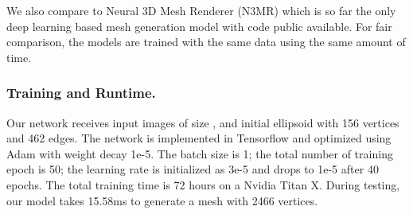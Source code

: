 \documentclass[runningheads]{llncs}
\begin{document}
We also compare to Neural 3D Mesh Renderer (N3MR) \cite{KatoUH2018} which is so far the only deep learning based mesh generation model with code public available. For fair comparison, the models are trained with the same data using the same amount of time.

\subsubsection{Training and Runtime.} Our network receives input images of size , and initial ellipsoid with 156 vertices and 462 edges. The network is implemented in Tensorflow and optimized using Adam with weight decay 1e-5. The batch size is 1; the total number of training epoch is 50; the learning rate is initialized as 3e-5 and drops to 1e-5 after 40 epochs. The total training time is 72 hours on a Nvidia Titan X. During testing, our model takes 15.58ms to generate a mesh with 2466 vertices.
\end{document}
